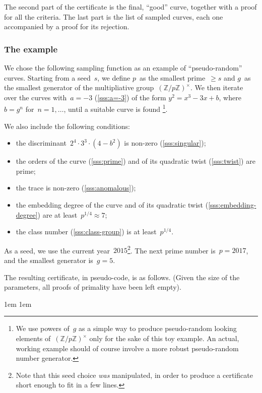 \documentclass[twocolumn,letterpaper,10pt]{article}
\begin{document}
The second part of the certificate is the final, “good” curve,
together with a proof for all the criteria.
The last part is the list of sampled curves,
each one accompanied by a proof for its rejection.

\subsubsection{The example}

We chose the following sampling function as an example
of “pseudo-random” curves.
Starting from a seed~$s$, we define $p$~as the smallest prime~$≥ s$
and $g$~as the smallest generator of the multipliative group~$(ℤ/pℤ)^{×}$.
We then iterate over the curves with~$a = -3$ (\ref{sss:a=-3})
of the form $y^2 = x^3 - 3 x + b$, where $b = g^n$ for~$n = 1, …$,
until a suitable curve is found%
\footnote{We use powers of~$g$ as a simple way to produce pseudo-random
looking elements of~$(ℤ/pℤ)^{×}$ only for the sake of this toy example.
An actual, working example should of course involve a more robust
pseudo-random number generator.}.

We also include the following conditions:
\begin{itemize} \itemsep 0pt \parskip 0pt
\item the discriminant~$2^4·3^3·(4-b^2)$ is non-zero
(\ref{sss:singular});
\item the orders of the curve (\ref{sss:prime}) and of its quadratic twist
(\ref{sss:twist}) are prime;
\item the trace is non-zero (\ref{sss:anomalous});
\item the embedding degree of the curve and of its quadratic twist
(\ref{sss:embedding-degree}) are at least~$p^{1/4} ≈ 7$;
\item the class number (\ref{sss:class-group}) is at least~$p^{1/4}$.
\end{itemize}

As a seed, we use the current year~$2015$\footnote{%
Note that this seed choice \emph{was} manipulated,
in order to produce a certificate short enough to fit in a few lines.}.
The next prime number is~$p = 2017$, and the smallest generator is~$g = 5$.

The resulting certificate, in pseudo-code, is as follows.
(Given the size of the parameters,
all proofs of primality have been left empty).

\begingroup \advance \leftskip 1em \advance \rightskip 1em
\parindent 0pt \sffamily
\def\header#1{\par\goodbreak \textbf{#1}
\vskip -2ex \leavevmode \leaders\vrule height 1pt \hfill \hbox{}
\par}
\end{document}
